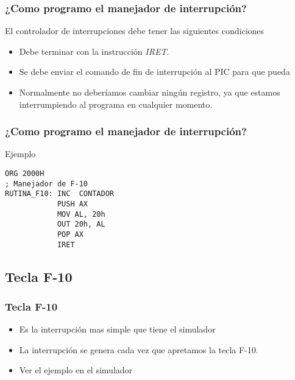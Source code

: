 \documentclass{beamer}
\begin{document}
\begin{frame}[fragile]
\frametitle{¿Como programo el manejador de interrupción?}
El controlador de interrupciones debe tener las siguientes condiciones
\begin{itemize} 
 \item Debe terminar con la instrucción \emph{IRET}.
 \item Se debe enviar el comando de fin de interrupción al PIC para que pueda 
 \item Normalmente no deberíamos cambiar ningún registro, ya que estamos interrumpiendo al programa en cualquier momento.
\end{itemize}
\end{frame}

\begin{frame}[fragile]
\frametitle{¿Como programo el manejador de interrupción?}
\begin{block}{Ejemplo}
\begin{verbatim}
ORG 2000H
; Manejador de F-10
RUTINA_F10: INC  CONTADOR
            PUSH AX
            MOV AL, 20h
            OUT 20h, AL
            POP AX
            IRET
\end{verbatim}
\end{block}

\end{frame}


\subsection{Tecla F-10}
\begin{frame}
\frametitle{Tecla F-10}
\begin{itemize}
 \item Es la interrupción mas simple que tiene el simulador
 \item La interrupción se genera cada vez que apretamos la tecla F-10.
 \item Ver el ejemplo en el simulador
\end{itemize}

\end{frame}
\end{document}
